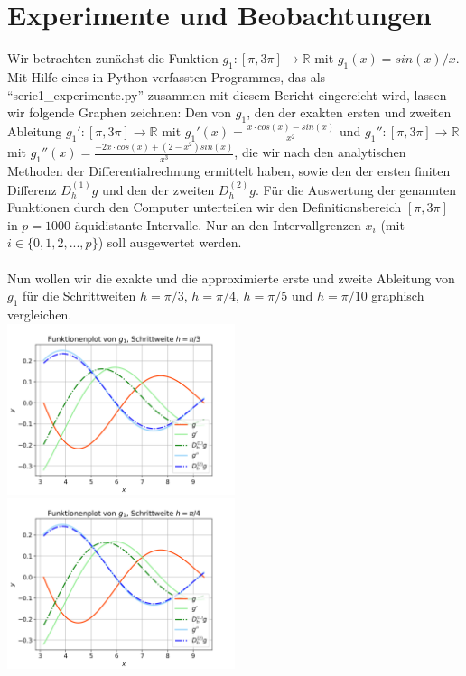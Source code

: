\documentclass{scrartcl}
\begin{document}
\pagebreak \section{Experimente und Beobachtungen}
\label{sec:experimente}

Wir betrachten zunächst die Funktion $g_1:[\pi, 3\pi] \rightarrow \mathbb{R}$ mit $g_1(x) = sin(x)/x$. Mit Hilfe eines in Python verfassten Programmes, das als "`serie1\_experimente.py"' zusammen mit diesem Bericht eingereicht wird, lassen wir folgende Graphen zeichnen:
Den von $g_1$, den der exakten ersten und zweiten Ableitung $g_1': [\pi, 3\pi] \rightarrow \mathbb{R}$ mit $g_1'(x) = \frac{x \cdot cos(x) - sin(x)}{x^{2}}$ und $g_1'': [\pi, 3\pi] \rightarrow \mathbb{R}$ mit $g_1''(x) = \frac{-2x \cdot cos(x) + (2-x^{2}) sin(x)}{x^{3}}$, die wir nach den analytischen Methoden der Differentialrechnung ermittelt haben, sowie den der ersten finiten Differenz $D_h^{(1)}g$ und den der zweiten $D_h^{(2)}g$.
Für die Auswertung der genannten Funktionen durch den Computer unterteilen wir den Definitionsbereich $[\pi, 3\pi]$ in $p = 1000$ äquidistante Intervalle.
Nur an den Intervallgrenzen $x_i$ (mit $i \in \lbrace 0, 1, 2, ..., p \rbrace$) soll ausgewertet werden. \\
\\
Nun wollen wir die exakte und die approximierte erste und zweite Ableitung von $g_1$ für die Schrittweiten $h = \pi/3$, $h = \pi/4$, $h = \pi/5$ und $h = \pi/10$ graphisch vergleichen. \\
\includegraphics[width=0.5\textwidth]{Grafiken/Funktionenplot_Pi_Drittel} \includegraphics[width=0.5\textwidth]{Grafiken/Funktionenplot_Pi_Viertel}\\
\end{document}
